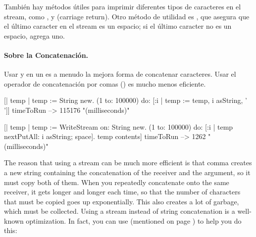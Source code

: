 \documentclass[a4paper,10pt,twoside]{book}
\begin{document}
{%
Tambi\'en hay m\'etodos \'utiles para imprimir diferentes tipos de caracteres en el stream, 
como ,  y  (carriage return).
Otro m\'etodo de utilidad es , que asegura que el \'ultimo caracter
en el stream es un espacio; si el \'ultimo caracter no es un espacio, agrega uno. 

\paragraph{Sobre la Concatenaci\'on.}
Usar  y  en un  es a menudo la mejora forma de concatenar caracteres. Usar el operador de concatenaci\'on por comas (\ct{,}) es mucho menos eficiente. 

\begin{code}{}
[| temp |
  temp := String new.
  (1 to: 100000)
    do: [:i | temp := temp, i asString, ' ']] timeToRun --> 115176 "(milliseconds)"

[| temp |
  temp := WriteStream on: String new.
  (1 to: 100000)
    do: [:i | temp nextPutAll: i asString; space].
  temp contents] timeToRun --> 1262 "(milliseconds)"
\end{code}

The reason that using a stream can be much more efficient is that 
comma creates a new string containing
the concatenation of the receiver and the argument, so it must copy both of them.
When you repeatedly concatenate onto the same receiver, it gets longer and longer each time,
so that the number of characters that must be copied goes up exponentially.
This also creates a lot of garbage, which must be collected. Using
a stream instead of string concatenation is a well-known optimization.
In fact, you can use  (mentioned on page \pageref{sec:streamContents}) to help you do this:

}
\end{document}
